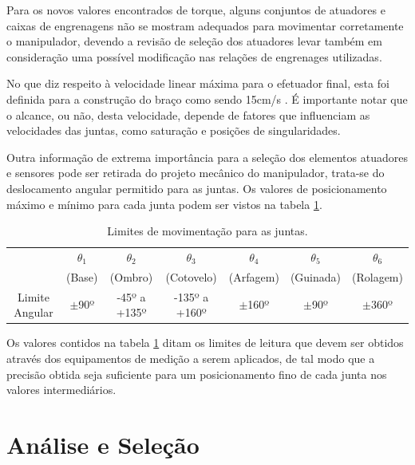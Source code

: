 Para os novos valores encontrados de torque, alguns conjuntos de atuadores
e caixas de engrenagens não se mostram adequados para movimentar corretamente
o manipulador, devendo a revisão de seleção dos atuadores levar também em 
consideração uma possível modificação nas relações de engrenages utilizadas.

No que diz respeito à velocidade linear máxima para o efetuador final, 
esta foi definida para a construção do braço como sendo 15cm/s \cite{fernando2019assistivo}.
É importante notar que o alcance, ou não, desta velocidade, depende de 
fatores que influenciam as velocidades das juntas, como saturação e
posições de singularidades.

Outra informação de extrema importância para a seleção dos elementos atuadores e 
sensores pode ser retirada do projeto mecânico do manipulador, trata-se do 
deslocamento angular permitido para as juntas. Os valores de 
posicionamento máximo e mínimo para cada junta podem ser vistos na 
tabela \ref{tab:Tabela-Alcance}.

\begin{table}[h]
\begin{centering}    
    
\begin{tabular}{|c|c|c|c|c|c|c|}
    \hline
    & $\theta_1$ & $\theta_2$ & $\theta_3$ & $\theta_4$ & $\theta_5$ & $\theta_6$ \tabularnewline
    & (Base) & (Ombro) & (Cotovelo) & (Arfagem) & (Guinada) & (Rolagem) \tabularnewline
    \hline
    \hline
    Limite Angular & $\pm$90º & -45º a +135º & -135º a +160º & $\pm$160º & $\pm$90º & $\pm$360º\tabularnewline
    \hline
\end{tabular}
    
\caption{Limites de movimentação para as juntas.}
\label{tab:Tabela-Alcance}

\par\end{centering}
\end{table}

Os valores contidos na tabela \ref{tab:Tabela-Alcance} ditam os limites 
de leitura que devem ser obtidos através dos equipamentos de medição a 
serem aplicados, de tal modo que a precisão obtida seja suficiente 
para um posicionamento fino de cada junta nos valores intermediários.

\section{Análise e Seleção}
\label{sec:AnaliseEletro}


